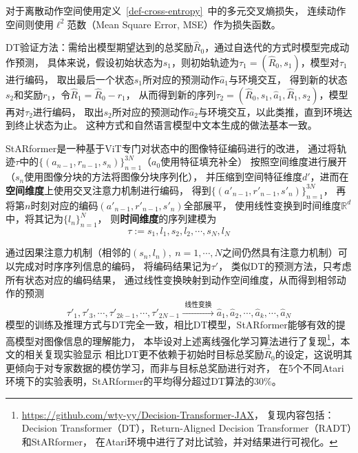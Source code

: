 对于离散动作空间使用定义~\ref{def-cross-entropy}~中的多元交叉熵损失，
连续动作空间则使用$\ell^2$范数（Mean Square Error, MSE）作为损失函数。

DT验证方法：需给出模型期望达到的总奖励$\hat{R}_0$，通过自迭代的方式时模型完成动作预测，
具体来说，假设初始状态为$s_1$，则初始轨迹为$\tau_1=(\hat{R}_0,s_1)$，模型对$\tau_1$进行编码，
取出最后一个状态$s_1$所对应的预测动作$\hat{a}_1$与环境交互，
得到新的状态$s_2$和奖励$r_1$，令$\hat{R}_1 = \hat{R}_0 - r_1$，
从而得到新的序列$\tau_2 = (\hat{R}_0,s_1,\hat{a}_1, \hat{R}_1, s_2)$，模型再对$\tau_2$进行编码，
取出$s_2$所对应的预测动作$\hat{a}_2$与环境交互，以此类推，直到环境达到终止状态为止。
这种方式和自然语言模型中文本生成的做法基本一致。

\label{sec-starformer}
StARformer是一种基于ViT专门对状态中的图像特征编码进行的改进，
通过将轨迹$\tau$中的$\{(a_{n-1},r_{n-1},s_{n})\}_{n=1}^{3N}$（$a_0$使用特征填充补全）
按照空间维度进行展开（$s_{n}$使用图像分块的方法将图像分块序列化），
并压缩到空间特征维度$d'$，进而在\textbf{空间维度}上使用交叉注意力机制进行编码，
得到$\{(a'_{n-1},r'_{n-1},s'_{n})\}_{n=1}^{3N}$，
再将第$n$时刻对应的编码$(a'_{n-1},r'_{n-1},s'_{n})$全部展平，
使用线性变换到时间维度$\mathbb{R}^d$中，将其记为$\{l_{n}\}_{n=1}^N$，
则\textbf{时间维度}的序列建模为
\begin{equation}
  \tau:=s_1,l_1,s_2,l_2,\cdots,s_N,l_N
\end{equation}

通过因果注意力机制（相邻的$(s_n,l_n),~n=1,\cdots,N$之间仍然具有注意力机制）可以完成对时序序列信息的编码，
将编码结果记为$\tau'$，
类似DT的预测方法，只考虑所有状态对应的编码结果，
通过线性变换映射到动作空间维度，从而得到相邻动作的预测
\begin{equation}
  \tau'_1,\tau'_3,\cdots, \tau'_{2k-1},\cdots,\tau'_{2N-1}\xrightarrow{\text{~线性变换~}}
  \hat{a}_1,\hat{a}_2,\cdots, \hat{a}_{k},\cdots, \hat{a}_{N}
\end{equation}
模型的训练及推理方式与DT完全一致，相比DT模型，StARformer能够有效的提高模型对图像信息的理解能力，
本毕设对上述离线强化学习算法进行了复现\footnote{\url{https://github.com/wty-yy/Decision-Transformer-JAX}，
复现内容包括：Decision Transformer（DT），Return-Aligned Decision Transformer（RADT）和StARformer，
在Atari环境中进行了对比试验，并对结果进行可视化。}，本文的相关复现实验显示
相比DT更不依赖于初始时目标总奖励$\hat{R}_0$的设定，这说明其更倾向于对专家数据的模仿学习，而非与目标总奖励进行对齐，
在5个不同Atari环境下的实验表明，StARformer的平均得分超过DT算法的$30\%$。


